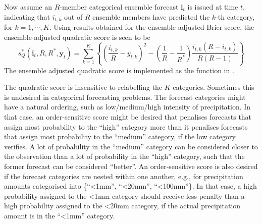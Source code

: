 \documentclass[article]{jss}\usepackage{graphicx, color}
\begin{document}
Now assume an $R$-member categorical ensemble forecast $\mathbf{i}_t$ is issued at time $t$, indicating that $i_{t,k}$ out of $R$ ensemble members have predicted the $k$-th category, for $k=1,\cdots,K$.
Using results obtained for the ensemble-adjusted Brier score, the ensemble-adjusted quadratic score is seen to be
%
\begin{equation}
s_{Q}^*(\mathbf{i}_t, R, R^*, \mathbf{y}_t) = \sum_{k=1}^K \left\{ \left(\frac{i_{t,k}}{R} - y_{t,k}\right)^2 - \left(\frac{1}{R} - \frac{1}{R^*}\right) \frac{i_{t,k}(R-i_{t,k})}{R(R-1)}\right\}
\end{equation}
%
The ensemble adjusted quadratic score is implemented as the function  in .


The quadratic score is insensitive to relabelling the $K$ categories.
Sometimes this is undesired in categorical forecasting problems. 
The forecast categories might have a natural ordering, such as low/medium/high intensity of precipitation.
In that case, an order-sensitive score might be desired that penalises forecasts that assign most probability to the ``high'' category more than it penalises forecasts that assign most probability to the ``medium'' category, if the low category verifies. 
A lot of probability in the ``medium'' category can be considered closer to the observation than a lot of probability in the ``high'' category, such that the former forecast can be considered ``better''.
An order-sensitive score is also desired if the forecast categories are nested within one another, e.g., for precipitation amounts categorised into \{``<1mm'', ``<20mm'', ``<100mm''\}.
In that case, a high probability assigned to the <1mm category should receive less penalty than a high probability assigned to the <20mm category, if the actual precipitation amount is in the ``<1mm'' category.
\end{document}
